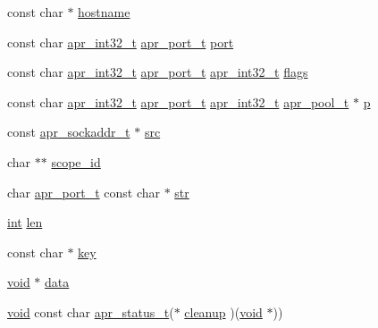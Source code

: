 \begin{DoxyCompactItemize}
\item 
const char $\ast$ \hyperlink{group__apr__network__io_gaad01339e89106fdf68f57ef118956fa9}{hostname}
\item 
const char \hyperlink{group__apr__platform_ga21ef1e35fd3ff9be386f3cb20164ff02}{apr\+\_\+int32\+\_\+t} \hyperlink{group__apr__network__io_gaa670a71960f6eb4fe0d0de2a1e7aba03}{apr\+\_\+port\+\_\+t} \hyperlink{group__apr__network__io_ga7a783046d954502f5fa0a0cdb6654d59}{port}
\item 
const char \hyperlink{group__apr__platform_ga21ef1e35fd3ff9be386f3cb20164ff02}{apr\+\_\+int32\+\_\+t} \hyperlink{group__apr__network__io_gaa670a71960f6eb4fe0d0de2a1e7aba03}{apr\+\_\+port\+\_\+t} \hyperlink{group__apr__platform_ga21ef1e35fd3ff9be386f3cb20164ff02}{apr\+\_\+int32\+\_\+t} \hyperlink{group__apr__network__io_ga219a94da607c8ebe22e5fdd16352697b}{flags}
\item 
const char \hyperlink{group__apr__platform_ga21ef1e35fd3ff9be386f3cb20164ff02}{apr\+\_\+int32\+\_\+t} \hyperlink{group__apr__network__io_gaa670a71960f6eb4fe0d0de2a1e7aba03}{apr\+\_\+port\+\_\+t} \hyperlink{group__apr__platform_ga21ef1e35fd3ff9be386f3cb20164ff02}{apr\+\_\+int32\+\_\+t} \hyperlink{structapr__pool__t}{apr\+\_\+pool\+\_\+t} $\ast$ \hyperlink{group__apr__network__io_gaf2558b77531cabefe36d422e32e8b65d}{p}
\item 
const \hyperlink{structapr__sockaddr__t}{apr\+\_\+sockaddr\+\_\+t} $\ast$ \hyperlink{group__apr__network__io_ga6ac23db8060cf7b18b347d4661f85a25}{src}
\item 
char $\ast$$\ast$ \hyperlink{group__apr__network__io_gac03f4c1705dcf958f913d4fdcaab00b5}{scope\+\_\+id}
\item 
char \hyperlink{group__apr__network__io_gaa670a71960f6eb4fe0d0de2a1e7aba03}{apr\+\_\+port\+\_\+t} const char $\ast$ \hyperlink{group__apr__network__io_gafdbeb683c68838a611351fefebb0c935}{str}
\item 
\hyperlink{pcre_8txt_a42dfa4ff673c82d8efe7144098fbc198}{int} \hyperlink{group__apr__network__io_ga8572aae04e7b7c0126ebaef27ebd82e0}{len}
\item 
const char $\ast$ \hyperlink{group__apr__network__io_ga4e743d3613a3276658e10b191108c249}{key}
\item 
\hyperlink{group__MOD__ISAPI_gacd6cdbf73df3d9eed42fa493d9b621a6}{void} $\ast$ \hyperlink{group__apr__network__io_ga735984d41155bc1032e09bece8f8d66d}{data}
\item 
\hyperlink{group__MOD__ISAPI_gacd6cdbf73df3d9eed42fa493d9b621a6}{void} const char \hyperlink{group__apr__errno_gaa5105fa83cc322f09382292db8b47593}{apr\+\_\+status\+\_\+t}($\ast$ \hyperlink{group__apr__network__io_gaa5b5c15aabf18cfa3b67a6233176198c}{cleanup} )(\hyperlink{group__MOD__ISAPI_gacd6cdbf73df3d9eed42fa493d9b621a6}{void} $\ast$))
$$
\end{DoxyCompactItemize}
